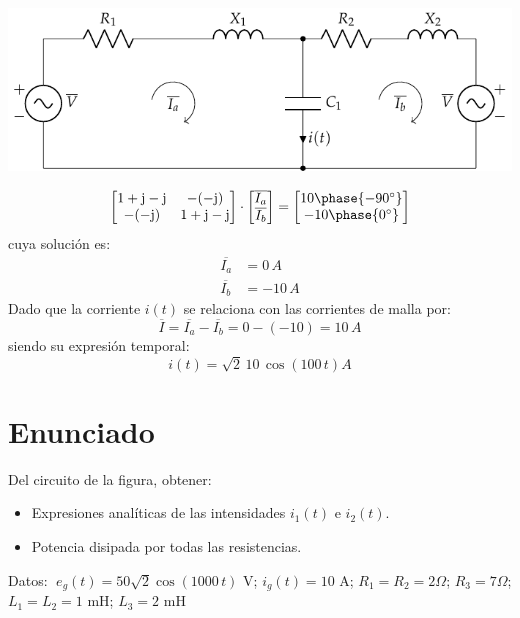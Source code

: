 \begin{center}
  \includegraphics{figuras/BT2_13_mod.pdf}
\end{center}

\begin{equation*}
  \begin{bmatrix}
    1+\mathrm{j}-\mathrm{j} & -(-\mathrm{j})\\
    -(-\mathrm{j}) & 1+\mathrm{j}-\mathrm{j}
  \end{bmatrix}
  \cdot
  \begin{bmatrix}
    \overline{I_a}\\
    \overline{I_b}
  \end{bmatrix}
  =
  \begin{bmatrix}
    10\phase{-90^\circ}\\
    -10\phase{0^\circ}
  \end{bmatrix}
\end{equation*}
cuya solución es:
\begin{align*}
  \overline{I_a}&=0\,A\\
  \overline{I_b}&=-10\,A
\end{align*}
Dado que la corriente $i(t)$ se relaciona con las corrientes de malla
por:
\begin{equation*}
  \overline{I}=\overline{I_a}-\overline{I_b}=0-(-10)=10\,A
\end{equation*}
siendo su expresión temporal:
\begin{equation*}
  i(t)=\sqrt{2}\,10\,\cos(100\,t) A
\end{equation*}



\section{Enunciado}
Del circuito de la figura, obtener:
\begin{itemize}
\item Expresiones analíticas de las intensidades $i_1(t)$ e $i_2(t)$.
\item Potencia disipada por todas las resistencias.
\end{itemize}
Datos: $\; e_g(t)=50\sqrt{2} \cos(1000\,t)$ V; $i_g(t)=10$ A;
$R_1=R_2=2\Omega$; $R_3=7\Omega$; $L_1=L_2=1$ mH; $L_3=2$ mH

